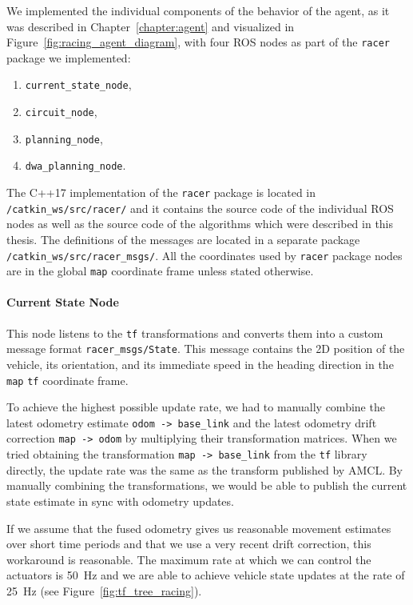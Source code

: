 We implemented the individual components of the behavior of the agent, as it was described in Chapter~\ref{chapter:agent} and visualized in Figure~\ref{fig:racing_agent_diagram}, with four \gls*{ROS} nodes as part of the \verb|racer| package we implemented:

\begin{enumerate}
	\item \verb|current_state_node|,	
	\item \verb|circuit_node|,
	\item \verb|planning_node|,	
	\item \verb|dwa_planning_node|.
\end{enumerate}

The C++17 implementation of the \verb|racer| package is located in \texttt{/catkin\_ws/\-src/racer/} and it contains the source code of the individual \gls*{ROS} nodes as well as the source code of the algorithms which were described in this thesis. The definitions of the messages are located in a separate package \texttt{/catkin\_ws/\allowbreak src/racer\_msgs/}. All the coordinates used by \verb|racer| package nodes are in the global \verb|map| coordinate frame unless stated otherwise.

\paragraph{Current State Node}

This node listens to the \verb|tf| transformations and converts them into a custom message format \verb|racer_msgs/State|. This message contains the 2D position of the vehicle, its orientation, and its immediate speed in the heading direction in the \verb|map| \verb|tf| coordinate frame.

To achieve the highest possible update rate, we had to manually combine the latest odometry estimate \verb|odom -> base_link| and the latest odometry drift correction \verb|map -> odom| by multiplying their transformation matrices. When we tried obtaining the transformation \verb|map -> base_link| from the \verb|tf| library directly, the update rate was the same as the transform published by \gls*{AMCL}. By manually combining the transformations, we would be able to publish the current state estimate in sync with odometry updates.

If we assume that the fused odometry gives us reasonable movement estimates over short time periods and that we use a very recent drift correction, this workaround is reasonable. The maximum rate at which we can control the actuators is \SI{50}{\hertz} and we are able to achieve vehicle state updates at the rate of \SI{25}{\hertz} (see Figure~\ref{fig:tf_tree_racing}).

